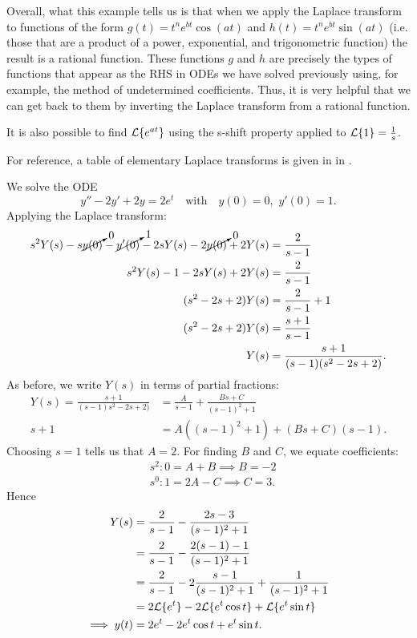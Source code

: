 Overall, what this example tells us is that when we apply the Laplace transform to functions of the form $g(t) = t^ne^{bt}\cos(at)$ and $h(t) = t^ne^{bt}\sin(at)$ (i.e. those that are a product of a power, exponential, and trigonometric function) the result is a rational function. These functions $g$ and $h$ are precisely the types of functions that appear as the RHS in ODEs we have solved previously using, for example, the method of undetermined coefficients. Thus, it is very helpful that we can get back to them by inverting the Laplace transform from a rational function.

\begin{remark}
	It is also possible to find $\mathcal{L}\{e^{at}\}$ using the s-shift property applied to $\mathcal{L}\{1\} = \frac{1}{s}$.
\end{remark}

For reference, a table of elementary Laplace transforms is given in  in .

\begin{eg}
	We solve the ODE
	\[
	y''-2y'+2y=2e^t \quad\text{with}\quad y(0)=0, \,\,y'(0)=1.
	\]
	Applying the Laplace transform:
	\begin{align*}
		s^2Y(s) - s\cancelto{0}{y(0)} - \cancelto{1}{y'(0)} - 2sY(s) - 2\cancelto{0}{y(0)} + 2Y(s) &= \frac{2}{s-1} \\
		s^2Y(s) - 1 - 2sY(s) + 2Y(s) &= \frac{2}{s-1} \\
		(s^2-2s+2)Y(s) &= \frac{2}{s-1} + 1 \\
		(s^2-2s+2)Y(s) &= \frac{s+1}{s-1} \\
		Y(s) &= \frac{s+1}{(s-1)(s^2-2s+2)}.
	\end{align*}
	As before, we write $Y(s)$ in terms of partial fractions:
	\begin{align*}
		Y(s) = \frac{s+1}{(s-1)s^2-2s+2)} &= \frac{A}{s-1} + \frac{Bs+C}{(s-1)^2+1} \\
		s+1 &= A((s-1)^2+1) + (Bs+C)(s-1).
	\end{align*}
	Choosing $s=1$ tells us that $A=2$. For finding $B$ and $C$, we equate coefficients:
	\begin{align*}
		&s^2 : 0 = A+B \implies B=-2 \\
		&s^0 : 1 = 2A-C \implies C=3.
	\end{align*}
	Hence
	\begin{align*}
		Y(s) &= \frac{2}{s-1} - \frac{2s-3}{(s-1)^2+1} \\
		&= \frac{2}{s-1} - \frac{2(s-1)-1}{(s-1)^2+1} \\
		&= \frac{2}{s-1} - 2\frac{s-1}{(s-1)^2+1} + \frac{1}{(s-1)^2+1} \\
		&= 2\mathcal{L}\{e^t\} - 2\mathcal{L}\{e^t\cos{t}\} + \mathcal{L}\{e^t\sin{t}\} \\
		\implies y(t) &= 2e^t - 2e^t\cos{t} + e^t\sin{t}.
	\end{align*}
\end{eg}

